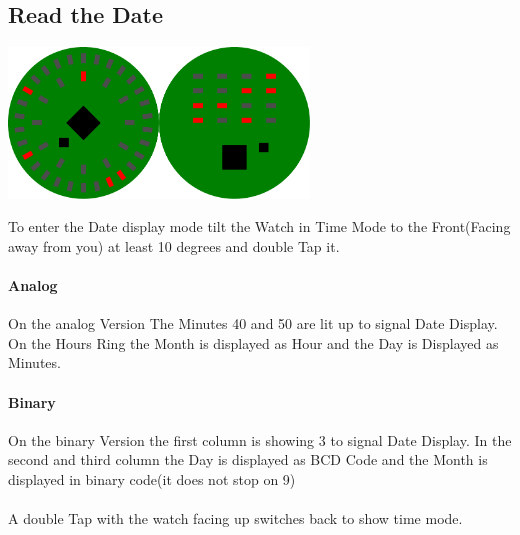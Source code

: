 \subsection{Read the Date}
\begin{center}
\includegraphics[width=0.6\textwidth]{../Graphics/Date25_Dez}
\end{center}
To enter the Date display mode tilt the Watch in Time Mode to the Front(Facing away from you) at least 10 degrees and double Tap it.
\paragraph{Analog}
On the analog Version The Minutes 40 and 50 are lit up to signal Date Display.
On the Hours Ring the Month is displayed as Hour and the Day is Displayed as Minutes.

\paragraph{Binary}
On the binary Version the first column is showing 3 to signal Date Display.
In the second and third column the Day is displayed as BCD Code and the Month is displayed in binary code(it does not stop on 9)\\
\\
A double Tap with the watch facing up switches back to show time mode.

